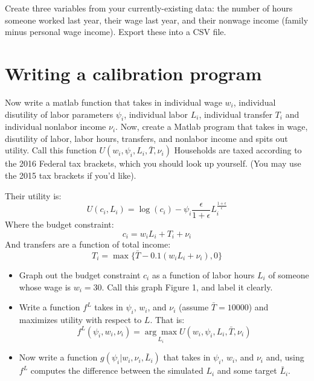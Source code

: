 \documentclass[11pt]{article}
\begin{document}
Create three variables from your currently-existing data: the number of hours someone worked last year, their wage last year, and their nonwage income (family minus personal wage income).  Export these into a CSV file.

\section*{Writing a calibration program}
Now write a matlab function that takes in individual wage $w_i$, individual disutility of labor parameters $\psi_i$, individual labor $L_i$, individual transfer $T_i$ and individual nonlabor income $\nu_i$. Now, create a Matlab program that takes in wage, disutility of labor, labor hours, transfers, and nonlabor income and spits out utility.  Call this function $U(w_i,\psi_i,L_i,\bar{T},\nu_i)$  Households are taxed according to the 2016 Federal  tax brackets, which  you should look up yourself.  (You may use the 2015 tax brackets if you'd like).  

Their utility is:
$$U(c_i,L_i)=\log(c_i)-\psi_i\frac{\epsilon}{1+\epsilon}L_i^{\frac{1+\epsilon}{\epsilon}}$$
Where the budget constraint:
$$c_i=w_iL_i+T_i+\nu_i$$
And transfers are a function of total income:
$$T_i=\max\{\bar{T}-0.1(w_iL_i+\nu_i),0\}$$

\begin{itemize}
\item Graph out the budget constraint $c_i$ as a function of labor hours $L_i$ of someone whose wage is $w_i=30$.  Call this graph Figure 1, and label it clearly.
\item Write a function $f^L$ takes in $\psi_i$, $w_i$, and $\nu_i$ (assume $\bar{T}=10000$) and maximizes utility with respect to $L$.  That is:
$$f^L(\psi_i,w_i,\nu_i)=\underset{L_i}{\arg \max}U(w_i,\psi_i,L_i,\bar{T},\nu_i)$$
\item Now write a function $g(\psi_i|w_i,\nu_i,\bar{L}_i)$ that takes in $\psi_i$, $w_i$, and $\nu_i$ and, using $f^L$ computes the difference between the simulated $L_i$ and some target $\bar{L}_i$.  
\end{itemize}
\end{document}
